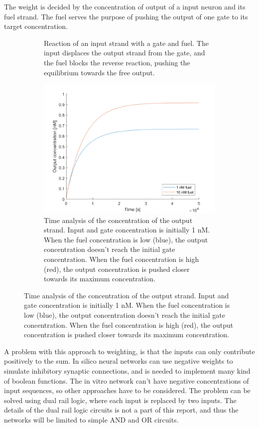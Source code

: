 The weight is decided by the concentration of output of a input neuron and its fuel strand. The fuel serves the purpose of pushing the output of one gate to its target concentration.

\begin{figure}[H]
  \begin{subfigure}[t]{.49\columnwidth}
    \centering
{} {

}
\caption{Reaction of an input strand with a gate and fuel. The input displaces the output strand from the gate, and the fuel blocks the reverse reaction, pushing the equilibrium towards the free output.}
\label{}
\end{subfigure}
\quad
\begin{subfigure}[t]{.49\columnwidth}
  \centering
\includegraphics[width=\linewidth]{images/weighting.png}
\caption{Time analysis of the concentration of the output strand. Input and gate concentration is initially 1 nM. When the fuel concentration is low (blue), the output concentration doesn't reach the initial gate concentration. When the fuel concentration is high (red), the output concentration is pushed closer towards its maximum concentration.}
\label{}
\end{subfigure}
\label{seesaw_weighting}
\end{figure}

A problem with this approach to weighting, is that the inputs can only contribute positively to the sum. In silico neural networks can use negative weights to simulate inhibitory synaptic connections, and is needed to implement many kind of boolean functions. The in vitro network can't have negative concentrations of input sequences, so other approaches have to be considered. The problem can be solved using dual rail logic, where each input is replaced by two inputs. The details of the dual rail logic circuits is not a part of this report, and thus the networks will be limited to simple AND and OR circuits.

